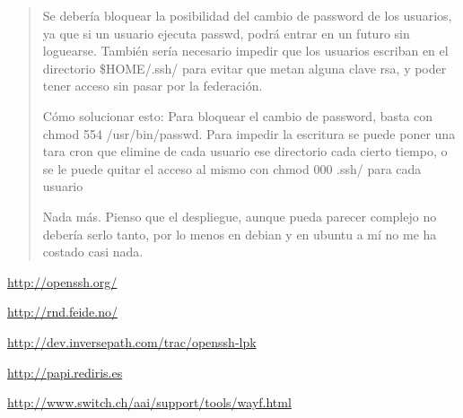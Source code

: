 \begin{quote}
Se debería bloquear la posibilidad del cambio de password de los
usuarios, ya que si un usuario ejecuta passwd, podrá entrar en un futuro
sin loguearse.
También sería necesario impedir que los usuarios escriban en el
directorio \$HOME/.ssh/ para evitar que metan alguna clave rsa, y poder
tener acceso sin pasar por la federación.

Cómo solucionar esto:
Para bloquear el cambio de password, basta con chmod
554 /usr/bin/passwd.
Para impedir la escritura se puede poner una tara cron que elimine de
cada usuario ese directorio cada cierto tiempo, o se le puede quitar el
acceso al mismo con chmod 000 .ssh/ para cada usuario


Nada más. Pienso que el despliegue, aunque pueda parecer complejo no
debería serlo tanto, por lo menos en debian y en ubuntu a mí no me ha
costado casi nada.


    \end{quote}


\newpage


\begin{thebibliography}{widest-label}

  \url{http://openssh.org/}

  \url{http://rnd.feide.no/}
 
  \url{http://dev.inversepath.com/trac/openssh-lpk}
 
  \url{http://papi.rediris.es}

  \url{http://www.switch.ch/aai/support/tools/wayf.html}


\end{thebibliography}



